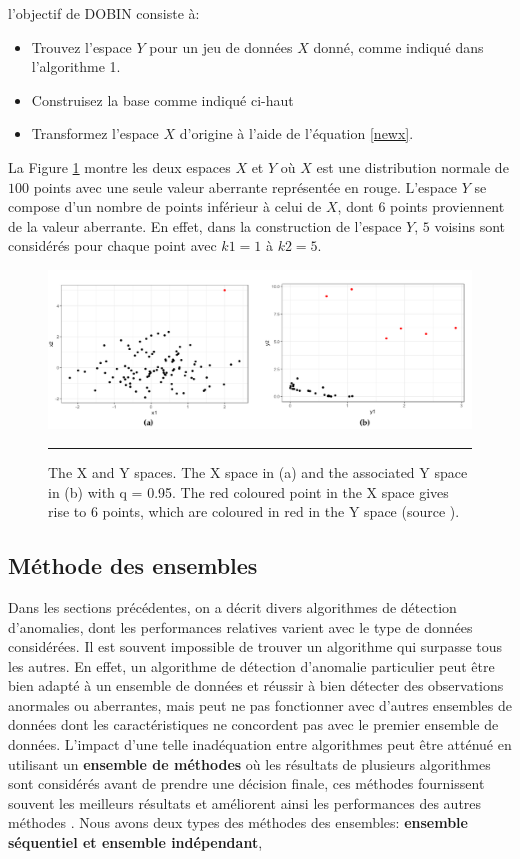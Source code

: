  l'objectif de DOBIN consiste à:
 \begin{itemize}
 \item  Trouvez l'espace $Y$ pour un jeu de données $X$ donné, comme indiqué dans l'algorithme 1.
 \item  Construisez la base comme indiqué ci-haut
 \item Transformez l'espace $X$ d'origine à l'aide de l'équation \eqref{newx}. 
 \end{itemize}
 La Figure \ref{fig00} montre les deux espaces $X$ et $Y$ où $X$ est une distribution normale 
 de $100$ points avec une seule valeur aberrante représentée en rouge. L'espace $Y$ se compose d'un nombre de points inférieur à celui de $X$, dont $6$ points proviennent de la valeur aberrante. En effet, dans la construction de l'espace $Y$, $5$ voisins sont considérés pour chaque point avec $k1 = 1$ à $k2 = 5$.
 \begin{figure}[ht]
    \centering
     \includegraphics[width=\textwidth]{ADOA/Images/ysapce.png}
    \caption{The X and Y spaces. The X space in (a) and the associated Y space in (b) with q = 0.95. The red coloured point in the X space gives rise to 6 points, which are coloured in red in the Y space (source \cite{A6}).}\hrule
    \label{fig00}
\end{figure}

%
\subsection{Méthode des ensembles}
%
%
Dans les sections précédentes, on a décrit divers algorithmes de détection d’anomalies, dont les performances relatives varient avec le type de données considérées. Il est souvent  impossible de trouver un algorithme qui surpasse tous les autres. En effet, un algorithme de détection d'anomalie particulier peut être bien adapté à un ensemble de données et réussir à bien détecter des observations anormales ou aberrantes, mais peut ne pas fonctionner avec d’autres ensembles de données dont les caractéristiques ne concordent pas avec le premier ensemble de données. L'impact d'une telle inadéquation  entre algorithmes peut être atténué en utilisant un \textbf{ ensemble  de méthodes} où les résultats de plusieurs algorithmes sont considérés avant de prendre une décision finale, ces méthodes fournissent souvent les meilleurs résultats et améliorent ainsi les performances des autres méthodes \cite{A10}. Nous avons deux types des méthodes des ensembles: \textbf{ensemble séquentiel et ensemble indépendant}, \newl
